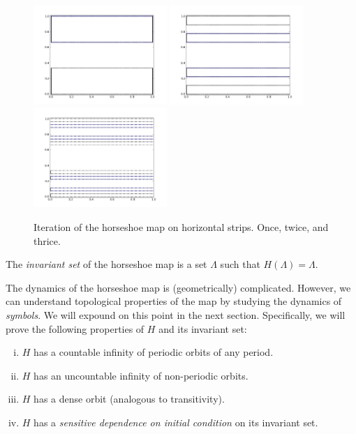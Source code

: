 \documentclass[12pt,twoside]{book}
\begin{document}
\begin{figure}[ht]
  \centering
    \includegraphics[width=0.45\textwidth]{horseshoe_h1}
    \hspace{2mm}
    \includegraphics[width=0.45\textwidth]{horseshoe_h2}
    \hspace{2mm}
    \includegraphics[width=0.45\textwidth]{horseshoe_h3}
  \caption{
    Iteration of the horseshoe map on horizontal strips. Once, twice, and thrice.
  }
  \label{fig:horseshoe-horizontal}
\end{figure}

The \textit{invariant set} of the horseshoe map is a set $\Lambda$ such that $H(\Lambda) = \Lambda$.

The dynamics of the horseshoe map is (geometrically) complicated.
However, we can understand topological properties of the map by studying the dynamics of \textit{symbols}.
We will expound on this point in the next section.
Specifically, we will prove the following properties of $H$ and its invariant set:
\begin{enumerate}[(i)]
  \item $H$ has a countable infinity of periodic orbits of any period.
  \item $H$ has an uncountable infinity of non-periodic orbits.
  \item $H$ has a dense orbit (analogous to transitivity).
  \item $H$ has a \textit{sensitive dependence on initial condition} on its invariant set.
\end{enumerate}
\end{document}
